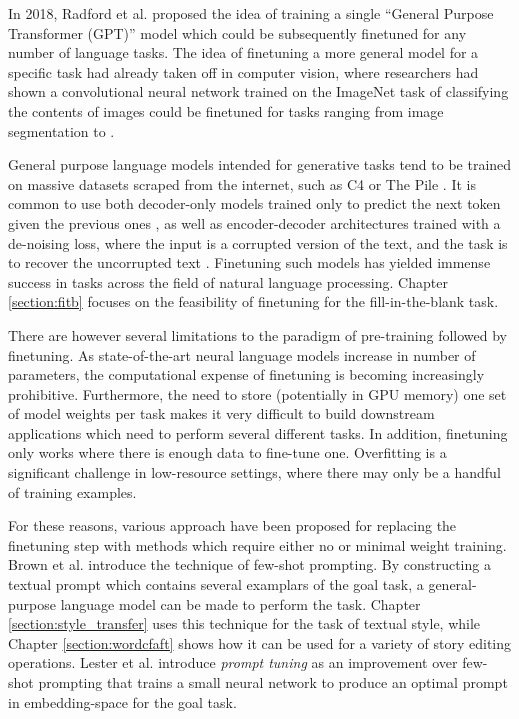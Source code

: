 In 2018, Radford et al. \citep{radford2018improving} proposed the idea of training a single ``General Purpose Transformer (GPT)'' model which could be subsequently finetuned for any number of language tasks.
The idea of finetuning a more general model for a specific task had already taken off in computer vision, where researchers had shown a convolutional neural network trained on the ImageNet task of classifying the contents of images could be finetuned for tasks ranging from image segmentation to \TODO{}.

General purpose language models intended for generative tasks tend to be trained on massive datasets scraped from the internet, such as C4 \citep{raffel2019exploring} or The Pile \citep{pile}.
It is common to use both decoder-only models trained only to predict the next token given the previous ones \citep{radford2019language}, as well as encoder-decoder architectures trained with a de-noising loss, where the input is a corrupted version of the text, and the task is to recover the uncorrupted text \citep{raffel2019exploring,lewis2020bart}.
Finetuning such models has yielded immense success in tasks across the field of natural language processing.
Chapter \ref{section:fitb} focuses on the feasibility of finetuning for the fill-in-the-blank task.

There are however several limitations to the paradigm of pre-training followed by finetuning.
As state-of-the-art neural language models increase in number of parameters, the computational expense of finetuning is becoming increasingly prohibitive.
Furthermore, the need to store (potentially in GPU memory) one set of model weights per task makes it very difficult to build downstream applications which need to perform several different tasks.
In addition, finetuning only works where there is enough data to fine-tune one.
Overfitting is a significant challenge in low-resource settings, where there may only be a handful of training examples.

For these reasons, various approach have been proposed for replacing the finetuning step with methods which require either no or minimal weight training.
Brown et al. \citep{brown2020language} introduce the technique of few-shot prompting.
By constructing a textual prompt which contains several examplars of the goal task, a general-purpose language model can be made to perform the task.
Chapter \ref{section:style_transfer} uses this technique for the task of textual style, while Chapter \ref{section:wordcfaft} shows how it can be used for a variety of story editing operations.
Lester et al. \citep{lester2021power} introduce \textit{prompt tuning} as an improvement over few-shot prompting that trains a small neural network to produce an optimal prompt in embedding-space for the goal task.
